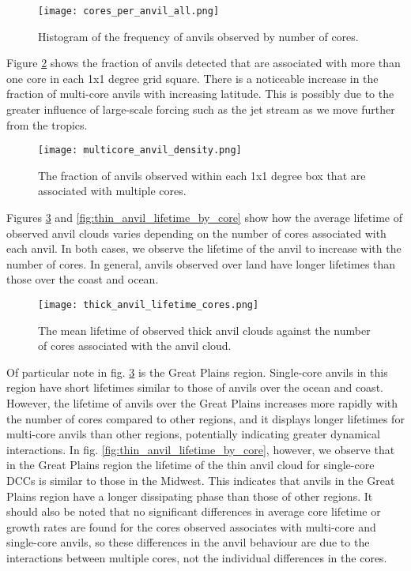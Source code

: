 \begin{figure}[b]
    \centering
    \texttt{[image: cores\_per\_anvil\_all.png]}
    \caption{Histogram of the frequency of anvils observed by number of cores.}
    \label{fig:multicore_frequency}
\end{figure}

Figure \ref{fig:multicore_fraction_map} shows the fraction of anvils detected that are associated with more than one core in each 1x1 degree grid square.
There is a noticeable increase in the fraction of multi-core anvils with increasing latitude.
This is possibly due to the greater influence of large-scale forcing such as the jet stream as we move further from the tropics.

\begin{figure}[t]
    \centering
    \texttt{[image: multicore\_anvil\_density.png]}
    \caption{The fraction of anvils observed within each 1x1 degree box that are associated with multiple cores.}
    \label{fig:multicore_fraction_map}
\end{figure}

Figures \ref{fig:anvil_lifetime_by_core} and \ref{fig:thin_anvil_lifetime_by_core} show how the average lifetime of observed anvil clouds varies depending on the number of cores associated with each anvil.
In both cases, we observe the lifetime of the anvil to increase with the number of cores.
In general, anvils observed over land have longer lifetimes than those over the coast and ocean.

\begin{figure}[h]
    \centering
    \texttt{[image: thick\_anvil\_lifetime\_cores.png]}
    \caption{The mean lifetime of observed thick anvil clouds against the number of cores associated with the anvil cloud.}
    \label{fig:anvil_lifetime_by_core}
\end{figure}

Of particular note in fig. \ref{fig:anvil_lifetime_by_core} is the Great Plains region.
Single-core anvils in this region have short lifetimes similar to those of anvils over the ocean and coast.
However, the lifetime of anvils over the Great Plains increases more rapidly with the number of cores compared to other regions, and it displays longer lifetimes for multi-core anvils than other regions, potentially indicating greater dynamical interactions.
In fig. \ref{fig:thin_anvil_lifetime_by_core}, however, we observe that in the Great Plains region the lifetime of the thin anvil cloud for single-core DCCs is similar to those in the Midwest.
This indicates that anvils in the Great Plains region have a longer dissipating phase than those of other regions.
It should also be noted that no significant differences in average core lifetime or growth rates are found for the cores observed associates with multi-core and single-core anvils, so these differences in the anvil behaviour are due to the interactions between multiple cores, not the individual differences in the cores.

